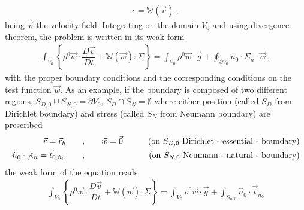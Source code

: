 \documentclass[letterpaper,10pt,english]{jupyterBook}
\begin{document}
\begin{equation*}
\begin{split}\mathbb{\epsilon} = \mathbb{W}(\vec{v}) \ ,\end{split}
\end{equation*}
\sphinxAtStartPar
being \(\vec{v}\) the velocity field. Integrating on the domain \(V_0\) and using divergence theorem, the problem is written in its weak form
\begin{equation*}
\begin{split}\int_{V_0} \left\{ \rho^0 \vec{w} \cdot \dfrac{D \vec{v}}{D t} + \mathbb{W}(\vec{w}) : \mathbb{\Sigma} \right\} = \int_{V_0} \rho^0 \vec{w} \cdot \vec{g} + \oint_{\partial V_0} \hat{n}_0 \cdot \mathbb{\Sigma}_n \cdot \vec{w} \ , \end{split}
\end{equation*}
\sphinxAtStartPar
with the proper boundary conditions and the corresponding conditions on the test function \(\vec{w}\). As an example, if the boundary is composed of two different regions, \(S_{D,0} \cup S_{N,0} = \partial V_0\), \(S_D \cap S_N = \emptyset\) where either position (called \(S_D\) from Dirichlet boundary) and stress (called \(S_N\) from Neumann boundary) are prescribed
\begin{equation*}
\begin{split}\begin{aligned}
  \vec{r} = \vec{r}_b \qquad , \qquad & \vec{w} = \vec{0} & \qquad \text{(on $ S_{D,0} $ Dirichlet - essential - boundary)} \\
  \hat{n}_0 \cdot \mathbb{\Sigma}_n = \vec{t}_{0, \hat{n}_0} \qquad , \qquad & & \text{(on $ S_{N,0} $ Neumann - natural - boundary)} \\
\end{aligned}\end{split}
\end{equation*}
\sphinxAtStartPar
the weak form of the equation reads
\begin{equation*}
\begin{split}\int_{V_0} \left\{ \rho^0 \vec{w} \cdot \dfrac{D \vec{v}}{D t} + \mathbb{W}(\vec{w}) : \mathbb{\Sigma} \right\} = \int_{V_0} \rho^0 \vec{w} \cdot \vec{g} + \int_{S_{n,0}} \hat{n}_0 \cdot \vec{t}_{\hat{n}_0} \end{split}
\end{equation*}
\end{document}

